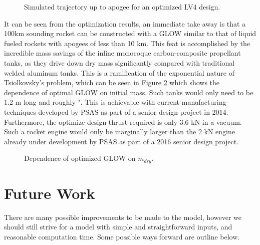 \documentclass[]{aiaa-tc}%
\begin{document}
\begin{figure}[h!]
  \centering
  
  \caption{Simulated trajectory up to apogee for an optimized LV4 design.}
  \label{fig:trajectory}
\end{figure}

It can be seen from the optimization results, an immediate take away is that a 100km sounding rocket can be constructed with a GLOW similar to that of liquid fueled rockets with apogees of less than 10 km. This feat is accomplished by the incredible mass savings of the inline monocoque  carbon-composite propellant tanks, as they drive down dry mass significantly compared with traditional welded aluminum tanks. This is a ramification of the exponential nature of Tsiolkovsky's problem, which can be seen in Figure \ref{fig:glowvsmdry} which shows the dependence of optimal GLOW on initial mass. Such tanks would only need to be 1.2 m long and roughly ". This is achievable with current manufacturing techniques developed by PSAS as part of a senior design project in 2014. Furthermore, the optimize design thrust required is only 3.6 kN in a vacuum. Such a rocket engine would only be marginally larger than the 2 kN engine already under development by PSAS as part of a 2016 senior design project. 

\begin{figure}[h!]
  \centering
  
  \caption{Dependence of optimized GLOW on $m_{dry}$.}
  \label{fig:glowvsmdry}
\end{figure}

\section{Future Work}
There are many possible improvements to be made to the model, however we should still strive for a model with simple and straightforward inputs, and reasonable computation time. Some possible ways forward are outline below.
\end{document}

